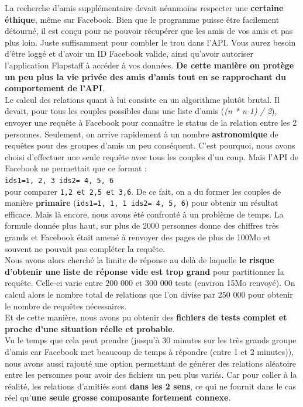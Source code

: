 \documentclass[a4paper, titlepage, oneside]{book}
\begin{document}
La recherche d'amis supplémentaire devait néanmoins respecter une \textbf{certaine éthique}, même sur Facebook. Bien que le programme puisse être facilement détourné, il est conçu pour ne pouvoir récupérer que les amis de vos amis et pas plus loin. Juste suffisamment pour combler le trou dans l'API. Vous aurez besoin d'être loggé et d'avoir un ID Facebook valide, ainsi qu'avoir autoriser l'application Flapstaff à accéder à vos données. \textbf{De cette manière on protège un peu plus la vie privée des amis d'amis tout en se rapprochant du comportement de l'API}.\\

Le calcul des relations quant à lui consiste en un algorithme plutôt brutal. Il devait, pour tous les couples possibles dans une liste d'amis (\emph{(n * n-1) / 2}), envoyer une requête à Facebook pour connaître le status de la relation entre les 2 personnes. Seulement, on arrive rapidement à un nombre \textbf{astronomique} de requêtes pour des groupes d'amis un peu conséquent. C'est pourquoi, nous avons choisi d'effectuer une seule requête avec tous les couples d'un coup. Mais l'API de Facebook ne permettait que ce format :\\

\texttt{ids1=1, 2, 3 ids2= 4, 5, 6}\\

pour comparer \texttt{1,2 et 2,5 et 3,6}. De ce fait, on a du former les couples de manière \textbf{primaire} (\texttt{ids1=1, 1, 1 ids2= 4, 5, 6}) pour obtenir un résultat efficace. Mais là encore, nous avons été confronté à un problème de temps. La formule donnée plus haut, sur plus de 2000 personnes donne des chiffres très grands et Facebook était amené à renvoyer des pages de plus de 100Mo et souvent ne pouvait pas compléter la requête.\\

Nous avons alors cherché la limite de réponse au delà de laquelle \textbf{le risque d'obtenir une liste de réponse vide est trop grand} pour partitionner la requête. Celle-ci varie entre 200 000 et 300 000 tests (environ 15Mo renvoyé). On calcul alors le nombre total de relations que l'on divise par 250 000 pour obtenir le nombre de requêtes nécessaires.\\
Et de cette manière, nous avons pu obtenir des \textbf{fichiers de tests complet et proche d'une situation réelle et probable}.\\

Vu le temps que cela peut prendre (jusqu'à 30 minutes sur les très grands groupe d'amis car Facebook met beaucoup de temps à répondre (entre 1 et 2 minutes)), nous avons aussi rajouté une option permettant de générer des relations aléatoire entre les personnes pour avoir des fichiers un peu plus variés. Car pour coller à la réalité, les relations d'amitiés sont \textbf{dans les 2 sens}, ce qui ne fournit dans le cas réel qu'\textbf{une seule grosse composante fortement connexe}.\\
\end{document}
